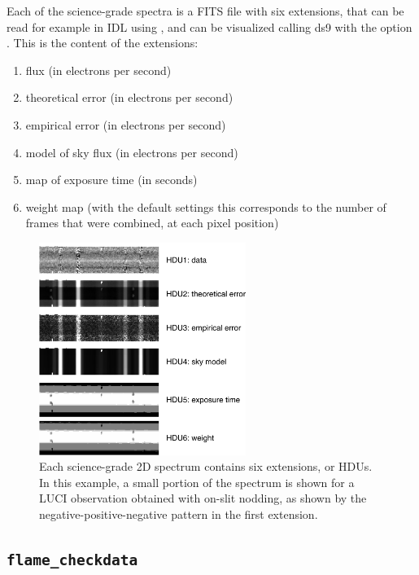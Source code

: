 \documentclass[a4paper]{article}
\begin{document}
\begin{sloppypar}
Each of the science-grade spectra is a FITS file with six extensions, that can be read for example in IDL using , and can be visualized calling ds9 with the option . This is the content of the extensions:
\begin{enumerate}
\item flux (in electrons per second)
\item theoretical error (in electrons per second)
\item empirical error (in electrons per second)
\item model of sky flux (in electrons per second)
\item map of exposure time (in seconds)
\item weight map (with the default settings this corresponds to the number of frames that were combined, at each pixel position)
\end{enumerate}


\begin{figure}[tbp]
\centering
\includegraphics[width=0.6\textwidth]{extensions}
\caption{Each science-grade 2D spectrum contains six extensions, or HDUs. In this example, a small portion of the spectrum is shown for a LUCI observation obtained with on-slit nodding, as shown by the negative-positive-negative pattern in the first extension.}
\label{fig:extensions}
\end{figure}



\subsection{\texttt{flame\_checkdata}}
\label{sec:checkdata}


\end{sloppypar}
\end{document}
